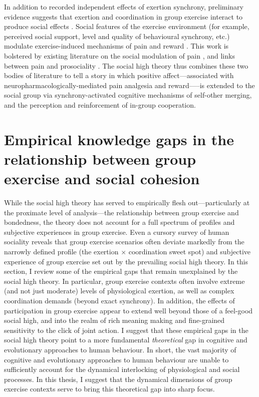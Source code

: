 \begin{CJK}{UTF8}{gbsn}
In addition to recorded independent effects of exertion synchrony,  preliminary evidence suggests that exertion and coordination in group exercise interact to produce social effects \citep{Jackson2018}.  Social features of the exercise environment (for example, perceived social support, level and quality of behavioural synchrony, etc.) modulate exercise-induced mechanisms of pain and reward \citep{Cohen2009,Sullivan2014,Tarr2015,Davis2015,Weinstein2016}. This work is bolstered by existing literature on the social modulation of pain \citep{Eisenberger2012a}, and links between pain and prosociality \citep{Bastian2014a}.  The social high theory thus combines these two bodies of literature to tell a story in which positive affect---associated with neuropharmacologically-mediated pain analgesia and reward—--is extended to the social group via synchrony-activated cognitive mechanisms of self-other merging, and the perception and reinforcement of in-group cooperation.


\section{Empirical knowledge gaps in the relationship between group exercise and social cohesion\label{sect:empKnowGaps}}
While the social high theory has served to empirically flesh out---particularly at the proximate level of analysis---the relationship between group exercise and bondedness, the theory does not account for a full spectrum of profiles and subjective experiences in group exercise.  Even a cursory survey of human sociality reveals that group exercise scenarios often deviate markedly from the narrowly defined profile (the exertion $\times$ coordination sweet spot) and subjective experience of group exercise set out by the prevailing social high theory.  In this section, I review some of the empirical gaps that remain unexplained by the social high theory.  In particular, group exercise contexts often involve extreme (and not just moderate) levels of physiological exertion, as well as complex coordination demands (beyond exact synchrony).  In addition, the effects of participation in group exercise appear to extend well beyond those of a feel-good social high, and into the realm of rich meaning making and fine-grained sensitivity to the click of joint action.  I suggest that these empirical gaps in the social high theory point to a more fundamental \textit{theoretical} gap in cognitive and evolutionary approaches to human behaviour.  In short, the vast majority of cognitive and evolutionary approaches to human behaviour are unable to sufficiently account for the dynamical interlocking of physiological and social processes. In this thesis, I suggest that the dynamical dimensions of group exercise contexts serve to bring this theoretical gap into sharp focus.


\end{CJK}

